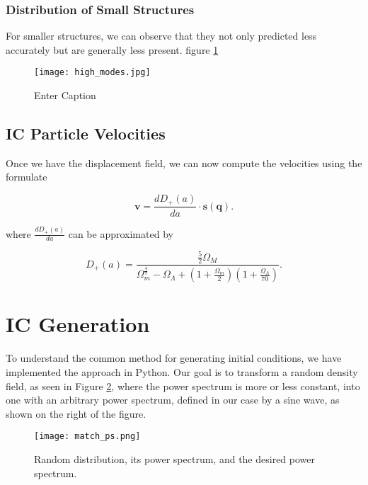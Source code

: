 
\subsubsection{Distribution of Small Structures}
For smaller structures, we can observe that they not only predicted less accurately but are generally less present. figure \ref{fig:high-modes}

\begin{figure}[h]
    \centering
    \texttt{[image: high\_modes.jpg]}
    \caption{Enter Caption}
    \label{fig:high-modes}
\end{figure}


\subsection{IC Particle Velocities}

Once we have the displacement field, we can now compute the velocities using the formulate

\begin{equation}
    \mathbf{v} = \frac{d D_+(a)}{d a} \cdot \mathbf{s}(\mathbf{q}).
\end{equation}

where $\frac{d D_+(a)}{d a}$ can be approximated by

\begin{equation}
    D_+(a) = \frac{\frac{5}{2} \Omega_M}{
    \Omega_m^{\frac{4}{7}} - \Omega_{\Lambda} + ( 1 + \frac{\Omega_m}{2})(1 + \frac{\Omega_{\Lambda}}{70})
    }.
    \label{eq:growth_da}
\end{equation}



\section{IC Generation}
\label{IC-Gen}

To understand the common method for generating initial conditions, we have implemented the approach in Python. Our goal is to transform a random density field, as seen in Figure \ref{fig:random}, where the power spectrum is more or less constant, into one with an arbitrary power spectrum, defined in our case by a sine wave, as shown on the right of the figure.

\begin{figure}[h]
    \centering
    \texttt{[image: match\_ps.png]}
    \caption{Random distribution, its power spectrum, and the desired power spectrum.}
    \label{fig:random}
\end{figure}


